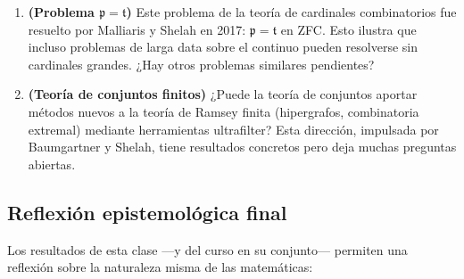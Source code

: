 \begin{enumerate}[leftmargin=2em, label=\textbf{PA\arabic*.}]
  \item \textbf{(Problema $\mathfrak{p} = \mathfrak{t}$)} Este problema de la teoría de cardinales combinatorios fue resuelto por Malliaris y Shelah en 2017: $\mathfrak{p} = \mathfrak{t}$ en ZFC. Esto ilustra que incluso problemas de larga data sobre el continuo pueden resolverse sin cardinales grandes. ¿Hay otros problemas similares pendientes?

  \item \textbf{(Teoría de conjuntos finitos)} ¿Puede la teoría de conjuntos aportar métodos nuevos a la teoría de Ramsey finita (hipergrafos, combinatoria extremal) mediante herramientas ultrafilter? Esta dirección, impulsada por Baumgartner y Shelah, tiene resultados concretos pero deja muchas preguntas abiertas.

\end{enumerate}

\subsection{Reflexión epistemológica final}

Los resultados de esta clase —y del curso en su conjunto— permiten una reflexión sobre la naturaleza misma de las matemáticas:

